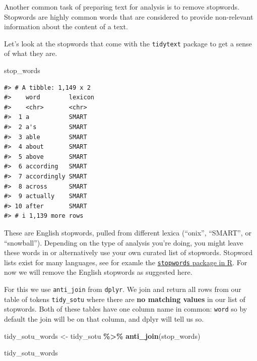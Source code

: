 \documentclass[
]{book}
\newenvironment{Shaded}{\begin{snugshade}}{\end{snugshade}}
\newcommand{\FunctionTok}[1]{\textcolor[rgb]{0.13,0.29,0.53}{\textbf{#1}}}
\newcommand{\NormalTok}[1]{#1}
\newcommand{\OtherTok}[1]{\textcolor[rgb]{0.56,0.35,0.01}{#1}}
\newcommand{\SpecialCharTok}[1]{\textcolor[rgb]{0.81,0.36,0.00}{\textbf{#1}}}
\begin{document}
Another common task of preparing text for analysis is to remove stopwords. Stopwords are highly common words that are considered to provide non-relevant information about the content of a text.

Let's look at the stopwords that come with the \texttt{tidytext} package to get a sense of what they are.

\begin{Shaded}
\begin{Highlighting}[]
\NormalTok{stop\_words}
\end{Highlighting}
\end{Shaded}

\begin{verbatim}
#> # A tibble: 1,149 x 2
#>    word        lexicon
#>    <chr>       <chr>  
#>  1 a           SMART  
#>  2 a's         SMART  
#>  3 able        SMART  
#>  4 about       SMART  
#>  5 above       SMART  
#>  6 according   SMART  
#>  7 accordingly SMART  
#>  8 across      SMART  
#>  9 actually    SMART  
#> 10 after       SMART  
#> # i 1,139 more rows
\end{verbatim}

These are English stopwords, pulled from different lexica (``onix'', ``SMART'', or ``snowball''). Depending on the type of analysis you're doing, you might leave these words in or alternatively use your own curated list of stopwords. Stopword lists exist for many languages, see for examle the \href{https://cran.r-project.org/package=stopwords}{\texttt{stopwords} package in R}. For now we will remove the English stopwords as suggested here.

For this we use \texttt{anti\_join} from \texttt{dplyr}. We join and return all rows from our table of tokens \texttt{tidy\_sotu} where there are \textbf{no matching values} in our list of stopwords. Both of these tables have one column name in common: \texttt{word} so by default the join will be on that column, and dplyr will tell us so.

\begin{Shaded}
\begin{Highlighting}[]
\NormalTok{tidy\_sotu\_words }\OtherTok{\textless{}{-}}\NormalTok{ tidy\_sotu }\SpecialCharTok{\%\textgreater{}\%} 
  \FunctionTok{anti\_join}\NormalTok{(stop\_words)}

\NormalTok{tidy\_sotu\_words}
\end{Highlighting}
\end{Shaded}
\end{document}
